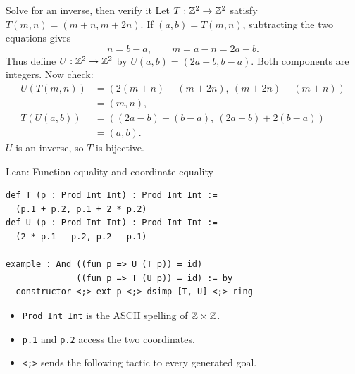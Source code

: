 \begin{frame}{Solve for an inverse, then verify it}
Let $T:\mathbb{Z}^2\to\mathbb{Z}^2$ satisfy $T(m,n)=(m+n,m+2n)$.
If $(a,b)=T(m,n)$, subtracting the two equations gives
\[
 n=b-a,\qquad m=a-n=2a-b.
\]
Thus define $U:\mathbb{Z}^2\to\mathbb{Z}^2$ by $U(a,b)=(2a-b,b-a)$.
Both components are integers. Now check:
\[
\begin{aligned}
U(T(m,n))&=(2(m+n)-(m+2n),\ (m+2n)-(m+n))\\
         &=(m,n),\\[2pt]
T(U(a,b))&=((2a-b)+(b-a),\ (2a-b)+2(b-a))\\
         &=(a,b).
\end{aligned}
\]
$U$ is an inverse, so $T$ is bijective.
\end{frame}

\begin{frame}[fragile]{Lean: Function equality and coordinate equality}
\begin{lstlisting}
def T (p : Prod Int Int) : Prod Int Int :=
  (p.1 + p.2, p.1 + 2 * p.2)
def U (p : Prod Int Int) : Prod Int Int :=
  (2 * p.1 - p.2, p.2 - p.1)

example : And ((fun p => U (T p)) = id)
              ((fun p => T (U p)) = id) := by
  constructor <;> ext p <;> dsimp [T, U] <;> ring
\end{lstlisting}
\begin{itemize}
\item \texttt{Prod Int Int} is the ASCII spelling of $\mathbb{Z}\times\mathbb{Z}$.
\item \texttt{p.1} and \texttt{p.2} access the two coordinates.
\item \texttt{<;>} sends the following tactic to every generated goal.
\end{itemize}
\end{frame}

